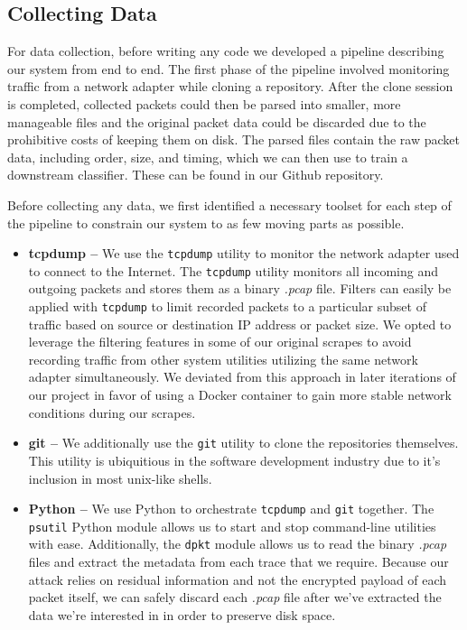 \documentclass[sigconf,authorversion,nonacm]{acmart}
\begin{document}
\subsection{Collecting Data}
For data collection, before writing any code we developed a pipeline describing our system from end to end. The first phase of the pipeline involved monitoring traffic from a network adapter while cloning a repository. After the clone session is completed, collected packets could then be parsed into smaller, more manageable files and the original packet data could be discarded due to the prohibitive costs of keeping them on disk. The parsed files contain the raw packet data, including order, size, and timing, which we can then use to train a downstream classifier. These can be found in our Github repository.

Before collecting any data, we first identified a necessary toolset for each step of the pipeline to constrain our system to as few moving parts as possible.
\begin{itemize}
  \item \textbf{tcpdump -- }We use the \texttt{tcpdump} utility to monitor the network adapter used to connect to the Internet. The \texttt{tcpdump} utility monitors all incoming and outgoing packets and stores them as a binary \textit{.pcap} file. Filters can easily be applied with \texttt{tcpdump} to limit recorded packets to a particular subset of traffic based on source or destination IP address or packet size. We opted to leverage the filtering features in some of our original scrapes to avoid recording traffic from other system utilities utilizing the same network adapter simultaneously. We deviated from this approach in later iterations of our project in favor of using a Docker container to gain more stable network conditions during our scrapes.
  \item \textbf{git -- }We additionally use the \texttt{git} utility to clone the repositories themselves. This utility is ubiquitious in the software development industry due to it's inclusion in most unix-like shells.
  \item \textbf{Python -- }We use Python to orchestrate \texttt{tcpdump} and \texttt{git} together. The \texttt{psutil} Python module allows us to start and stop command-line utilities with ease. Additionally, the \texttt{dpkt} module allows us to read the binary \textit{.pcap} files and extract the metadata from each trace that we require. Because our attack relies on residual information and not the encrypted payload of each packet itself, we can safely discard each \textit{.pcap} file after we've extracted the data we're interested in in order to preserve disk space.
\end{itemize}
\end{document}
